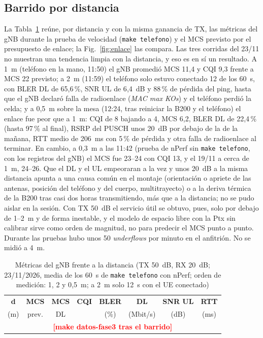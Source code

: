 \documentclass[conference]{IEEEtran}
\newcommand{\pendiente}[1]{\textcolor{red}{\textbf{[#1]}}}
\providecommand{\datosfilasdistancia}{\multicolumn{8}{c}{\pendiente{make datos-fase3 tras el barrido}} \\}
\begin{document}
\subsection{Barrido por distancia}
La Tabla~\ref{tab:distancia} reúne, por distancia y con la misma ganancia de TX, las métricas del gNB durante la prueba de velocidad (\texttt{make telefono}) y el MCS previsto por el presupuesto de enlace; la Fig.~\ref{fig:enlace} las compara. Las tres corridas del 23/11 no muestran una tendencia limpia con la distancia, y eso es en sí un resultado. A 1~m (teléfono en la mano, 11:50) el gNB promedió MCS 11{,}4 y CQI 9{,}3 frente a MCS 22 previsto; a 2~m (11:59) el teléfono solo estuvo conectado 12 de los 60~s, con BLER DL de 65{,}6\,\%, SNR UL de 6{,}4~dB y 88\,\% de pérdida del ping, hasta que el gNB declaró falla de radioenlace (\textit{MAC max KOs}) y el teléfono perdió la celda; y a 0{,}5~m sobre la mesa (12:24, tras reiniciar la B200 y el teléfono) el enlace fue peor que a 1~m: CQI de 8 bajando a 4, MCS 6{,}2, BLER DL de 22{,}4\,\% (hasta 97\,\% al final), RSRP del PUSCH unos 20~dB por debajo de la de la mañana, RTT medio de 206~ms con 5\,\% de pérdida y otra falla de radioenlace al terminar. En cambio, a 0{,}3~m a las 11:42 (prueba de nPerf sin \texttt{make telefono}, con los registros del gNB) el MCS fue 23--24 con CQI 13, y el 19/11 a cerca de 1~m, 24--26. Que el DL y el UL empeoraran a la vez y unos 20~dB a la misma distancia apunta a una causa común en el montaje (orientación o apriete de las antenas, posición del teléfono y del cuerpo, multitrayecto) o a la deriva térmica de la B200 tras casi dos horas transmitiendo, más que a la distancia; no se pudo aislar en la sesión. Con TX 50~dB el servicio útil se obtuvo, pues, solo por debajo de 1--2~m y de forma inestable, y el modelo de espacio libre con la Ptx sin calibrar sirve como orden de magnitud, no para predecir el MCS punto a punto. Durante las pruebas hubo unos 50 \textit{underflows} por minuto en el anfitrión. No se midió a 4~m.

\begin{table}[!t]
\caption{Métricas del gNB frente a la distancia (TX 50~dB, RX 20~dB; 23/11/2026, media de los 60~s de \texttt{make telefono} con nPerf; orden de medición: 1, 2 y 0{,}5~m; a 2~m solo 12~s con el UE conectado)}
\label{tab:distancia}
\centering
\footnotesize
\setlength{\tabcolsep}{2.5pt}
\begin{tabular}{cccccccc}
\toprule
\textbf{d} & \textbf{MCS} & \textbf{MCS} & \textbf{CQI} & \textbf{BLER} & \textbf{DL} & \textbf{SNR UL} & \textbf{RTT} \\
(m) & prev. & DL & & (\%) & (Mbit/s) & (dB) & (ms) \\
\midrule
\datosfilasdistancia
\bottomrule
\end{tabular}
\end{table}
\end{document}
